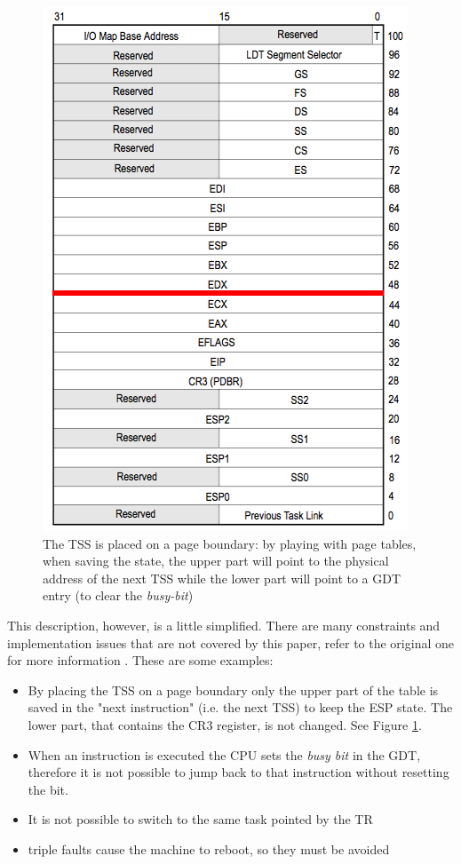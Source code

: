 \documentclass[11pt,twoside,a4paper]{article}
\begin{document}
\begin{figure}[ht]
\centering
\includegraphics[scale=0.3]{tss.png}
\captionsetup{width=13.5cm}
\caption{The TSS is placed on a page boundary: by playing with page tables, when saving the state, the upper part will point to the physical address of the next TSS while the lower part will point to a GDT entry (to clear the \emph{busy-bit})
}
\label{TSS_fig}
\end{figure}

This description, however, is a little simplified. There are many constraints and implementation issues that are not covered by this paper, refer to the original one for more information \cite{mmu_machine}. These are some examples:
\begin{itemize}
\item By placing the TSS on a page boundary only the upper part of the table is saved in the "next instruction" (i.e. the next TSS) to keep the ESP state. The lower part, that contains the CR3 register, is not changed. See Figure \ref{TSS_fig}.
\item When an instruction is executed the CPU sets the \emph{busy bit} in the GDT, therefore it is not possible to jump back to that instruction without resetting the bit.
\item It is not possible to switch to the same task pointed by the TR
\item triple faults cause the machine to reboot, so they must be avoided
\end{itemize}
\end{document}
